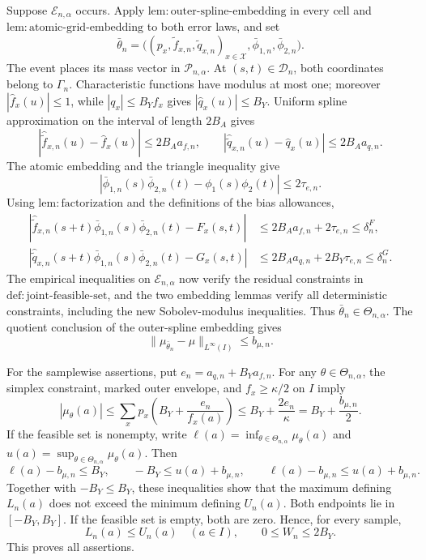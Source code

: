 Suppose \(\mathcal E_{n,\alpha}\) occurs. Apply \(\mathrm{lem{:}outer\text{-}spline\text{-}embedding}\) in every cell and \(\mathrm{lem{:}atomic\text{-}grid\text{-}embedding}\) to both error laws, and set
\[
 \bar\theta_n=
 \bigl((p_x,\widetilde f_{x,n},\widetilde q_{x,n})_{x\in\mathcal X},
       \bar\phi_{1,n},\bar\phi_{2,n}\bigr).
\]
The event places its mass vector in \(\mathcal P_{n,\alpha}\). At \((s,t)\in\mathcal D_n\), both coordinates belong to \(\Gamma_n\). Characteristic functions have modulus at most one; moreover \(|\widehat f_x(u)|\le1\), while \(|q_x|\le B_Yf_x\) gives \(|\widehat q_x(u)|\le B_Y\). Uniform spline approximation on the interval of length \(2B_A\) gives
\[
 |\widehat{\widetilde f}_{x,n}(u)-\widehat f_x(u)|\le2B_Aa_{f,n},
 \qquad
 |\widehat{\widetilde q}_{x,n}(u)-\widehat q_x(u)|\le2B_Aa_{q,n}.
\]
The atomic embedding and the triangle inequality give
\[
 |\bar\phi_{1,n}(s)\bar\phi_{2,n}(t)-\phi_1(s)\phi_2(t)|
 \le2\tau_{e,n}.
\]
Using \(\mathrm{lem{:}factorization}\) and the definitions of the bias allowances,
\[
 \begin{aligned}
 |\widehat{\widetilde f}_{x,n}(s+t)
   \bar\phi_{1,n}(s)\bar\phi_{2,n}(t)-F_x(s,t)|
 &\le2B_Aa_{f,n}+2\tau_{e,n}\le\delta^F_n,\\
 |\widehat{\widetilde q}_{x,n}(s+t)
   \bar\phi_{1,n}(s)\bar\phi_{2,n}(t)-G_x(s,t)|
 &\le2B_Aa_{q,n}+2B_Y\tau_{e,n}\le\delta^G_n.
 \end{aligned}
\]
The empirical inequalities on \(\mathcal E_{n,\alpha}\) now verify the residual constraints in \(\mathrm{def{:}joint\text{-}feasible\text{-}set}\), and the two embedding lemmas verify all deterministic constraints, including the new Sobolev-modulus inequalities. Thus \(\bar\theta_n\in\Theta_{n,\alpha}\). The quotient conclusion of the outer-spline embedding gives
\[
 \|\mu_{\bar\theta_n}-\mu\|_{L^\infty(I)}\le b_{\mu,n}.
\]

For the samplewise assertions, put \(e_n=a_{q,n}+B_Ya_{f,n}\). For any \(\theta\in\Theta_{n,\alpha}\), the simplex constraint, marked outer envelope, and \(f_x\ge\kappa/2\) on \(I\) imply
\[
 |\mu_\theta(a)|
 \le\sum_xp_x\left(B_Y+\frac{e_n}{f_x(a)}\right)
 \le B_Y+\frac{2e_n}{\kappa}
 =B_Y+\frac{b_{\mu,n}}2.
\]
If the feasible set is nonempty, write
\(\ell(a)=\inf_{\theta\in\Theta_{n,\alpha}}\mu_\theta(a)\) and
\(u(a)=\sup_{\theta\in\Theta_{n,\alpha}}\mu_\theta(a)\). Then
\[
 \ell(a)-b_{\mu,n}\le B_Y,
 \qquad -B_Y\le u(a)+b_{\mu,n},
 \qquad \ell(a)-b_{\mu,n}\le u(a)+b_{\mu,n}.
\]
Together with \(-B_Y\le B_Y\), these inequalities show that the maximum defining \(L_n(a)\) does not exceed the minimum defining \(U_n(a)\). Both endpoints lie in \([-B_Y,B_Y]\). If the feasible set is empty, both are zero. Hence, for every sample,
\[
 L_n(a)\le U_n(a)\quad(a\in I),
 \qquad0\le W_n\le2B_Y.
\]
This proves all assertions.

